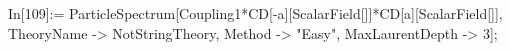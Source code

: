 In[109]:= ParticleSpectrum[Coupling1*CD[-a][ScalarField[]]*CD[a][ScalarField[]], TheoryName -> NotStringTheory, Method -> "Easy", MaxLaurentDepth -> 3]; 